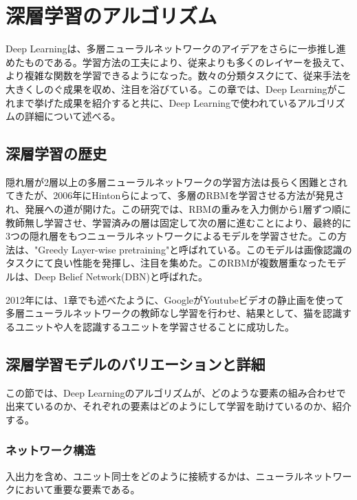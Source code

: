 \chapter{深層学習のアルゴリズム}
Deep Learningは、多層ニューラルネットワークのアイデアをさらに一歩推し進めたものである。学習方法の工夫により、従来よりも多くのレイヤーを扱えて、より複雑な関数を学習できるようになった。数々の分類タスクにて、従来手法を大きくしのぐ成果を収め、注目を浴びている。この章では、Deep Learningがこれまで挙げた成果を紹介すると共に、Deep Learningで使われているアルゴリズムの詳細について述べる。

\section{深層学習の歴史}
隠れ層が2層以上の多層ニューラルネットワークの学習方法は長らく困難とされてきたが、2006年にHintonらによって、多層のRBMを学習させる方法が発見され、発展への道が開けた\cite{hinton2006a-fast}。この研究では、RBMの重みを入力側から1層ずつ順に教師無し学習させ、学習済みの層は固定して次の層に進むことにより、最終的に3つの隠れ層をもつニューラルネットワークによるモデルを学習させた。この方法は、"Greedy Layer-wise pretraining"と呼ばれている。このモデルは画像認識のタスクにて良い性能を発揮し、注目を集めた。このRBMが複数層重なったモデルは、Deep Belief Network(DBN)と呼ばれた。\par
2012年には、1章でも述べたように、GoogleがYoutubeビデオの静止画を使って多層ニューラルネットワークの教師なし学習を行わせ、結果として、猫を認識するユニットや人を認識するユニットを学習させることに成功した。\par

\section{深層学習モデルのバリエーションと詳細}
この節では、Deep Learningのアルゴリズムが、どのような要素の組み合わせで出来ているのか、それぞれの要素はどのようにして学習を助けているのか、紹介する。
\subsection{ネットワーク構造}
入出力を含め、ユニット同士をどのように接続するかは、ニューラルネットワークにおいて重要な要素である。
